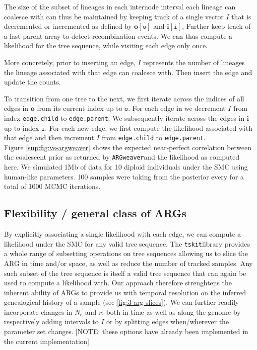 \documentclass{article}
\newcommand{\argweaver}[0]{\texttt{ARGweaver}}
\newcommand{\tskit}[0]{\texttt{tskit}}
\begin{document}
The size of the subset of lineages in each internode interval each lineage 
can coalesce with can thus be maintained by keeping track of a single vector $I$ 
that is decremented or incremented as defined by
$\textbf{o}[\texttt{o}]$ and $\textbf{i}[\texttt{i}]$, 
Further keep track of a last-parent array to detect recombination events.
We can thus compute a likelihood for the tree sequence, while visiting each edge only once.

More concretely, prior to inserting an edge, $I$ represents the number of lineages 
the lineage associated with 
that edge can coalesce with. Then insert the edge and update the counts.

To transition from one tree to the next, we first iterate across the indices of all edges 
in $\textbf{o}$ from its current index up to $\texttt{o}$. For each edge in we decrement $I$ 
from index \texttt{edge.child} to \texttt{edge.parent}. We subsequently iterate across the 
edges in $\textbf{i}$ up to index $\texttt{i}$. For each new edge, we first compute the likelihood 
associated with that edge and then 
increment $I$ from \texttt{edge.child} to \texttt{edge.parent}.\\

Figure \ref{sup:fig:vs-argweaver} shows the expected near-perfect correlation 
between the coalescent prior as returned by \argweaver and the likelihood as computed here. 
We simulated 1Mb of data for 10 diploid individuals 
under the SMC using human-like parameters. 100 samples were taking from the posterior every for 
a total of 1000 MCMC iterations.
 

\subsection{Flexibility / general class of ARGs}

By explicitly associating a single likelihood with each edge, we can compute a likelihood 
under the SMC for any valid tree sequence. The \tskit library provides a whole range  
of subsetting operations on tree sequences allowing us to slice the ARG in time and/or space, 
as well as reduce the number of tracked samples. 
Any such subset of the tree sequence is itself a valid tree sequence 
that can again be used to compute a likelihood with. Our approach therefore strenghtens 
the inherent ability of ARGs to provide us with temporal 
resolution on the inferred genealogical history of a sample (see \ref{fig:3-arg-slices}). 
We can further readily incorporate changes in $N_e$ and $r$, 
both in time as well as along the genome by respectively adding intervals to $I$ 
or by splitting edges when/wherever the parameter set changes.
[NOTE: these options have already been implemented in the current implementation]
\end{document}
